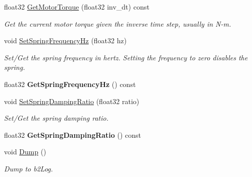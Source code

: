 \begin{DoxyCompactItemize}
\item 
float32 \hyperlink{classb2_wheel_joint_a4fbfb199ed267f7a2fad934cd2f4fbdc}{Get\+Motor\+Torque} (float32 inv\+\_\+dt) const \hypertarget{classb2_wheel_joint_a4fbfb199ed267f7a2fad934cd2f4fbdc}{}\label{classb2_wheel_joint_a4fbfb199ed267f7a2fad934cd2f4fbdc}

\begin{DoxyCompactList}\small\item\em Get the current motor torque given the inverse time step, usually in N-\/m. \end{DoxyCompactList}\item 
void \hyperlink{classb2_wheel_joint_af9f8fada5cb30f83aa2fbf486e9d347b}{Set\+Spring\+Frequency\+Hz} (float32 hz)\hypertarget{classb2_wheel_joint_af9f8fada5cb30f83aa2fbf486e9d347b}{}\label{classb2_wheel_joint_af9f8fada5cb30f83aa2fbf486e9d347b}

\begin{DoxyCompactList}\small\item\em Set/\+Get the spring frequency in hertz. Setting the frequency to zero disables the spring. \end{DoxyCompactList}\item 
float32 {\bfseries Get\+Spring\+Frequency\+Hz} () const \hypertarget{classb2_wheel_joint_a475fe44e145a7e3869c0a0ff5602bb20}{}\label{classb2_wheel_joint_a475fe44e145a7e3869c0a0ff5602bb20}

\item 
void \hyperlink{classb2_wheel_joint_a39b123ac045c8ec93faa65746e6655dc}{Set\+Spring\+Damping\+Ratio} (float32 ratio)\hypertarget{classb2_wheel_joint_a39b123ac045c8ec93faa65746e6655dc}{}\label{classb2_wheel_joint_a39b123ac045c8ec93faa65746e6655dc}

\begin{DoxyCompactList}\small\item\em Set/\+Get the spring damping ratio. \end{DoxyCompactList}\item 
float32 {\bfseries Get\+Spring\+Damping\+Ratio} () const \hypertarget{classb2_wheel_joint_ad991b903dd8b3820dfe3a2263b89f5aa}{}\label{classb2_wheel_joint_ad991b903dd8b3820dfe3a2263b89f5aa}

\item 
void \hyperlink{classb2_wheel_joint_a09534b6f4c5d0254711e0bcc7cf3b0e4}{Dump} ()\hypertarget{classb2_wheel_joint_a09534b6f4c5d0254711e0bcc7cf3b0e4}{}\label{classb2_wheel_joint_a09534b6f4c5d0254711e0bcc7cf3b0e4}

\begin{DoxyCompactList}\small\item\em Dump to b2\+Log. \end{DoxyCompactList}\end{DoxyCompactItemize}
